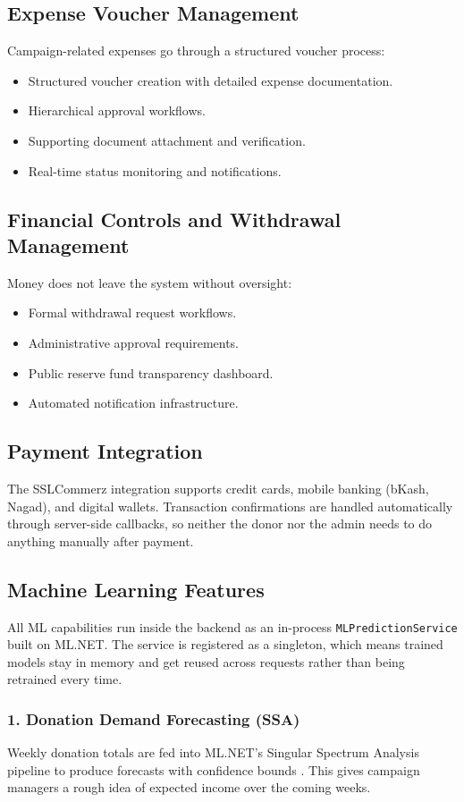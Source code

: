 \documentclass{thesis-library}
\begin{document}
\subsection{Expense Voucher Management}
Campaign-related expenses go through a structured voucher process:
\begin{itemize}
    \item Structured voucher creation with detailed expense documentation.
    \item Hierarchical approval workflows.
    \item Supporting document attachment and verification.
    \item Real-time status monitoring and notifications.
\end{itemize}

\subsection{Financial Controls and Withdrawal Management}
Money does not leave the system without oversight:
\begin{itemize}
    \item Formal withdrawal request workflows.
    \item Administrative approval requirements.
    \item Public reserve fund transparency dashboard.
    \item Automated notification infrastructure.
\end{itemize}

\subsection{Payment Integration}
The SSLCommerz integration supports credit cards, mobile banking (bKash, Nagad), and digital wallets. Transaction confirmations are handled automatically through server-side callbacks, so neither the donor nor the admin needs to do anything manually after payment.

\subsection{Machine Learning Features}
All ML capabilities run inside the backend as an in-process \texttt{MLPredictionService} built on ML.NET. The service is registered as a singleton, which means trained models stay in memory and get reused across requests rather than being retrained every time.

\subsubsection{1. Donation Demand Forecasting (SSA)}
Weekly donation totals are fed into ML.NET's Singular Spectrum Analysis pipeline to produce forecasts with confidence bounds \cite{chen2022machine,hassani2007singular}. This gives campaign managers a rough idea of expected income over the coming weeks.
\end{document}
